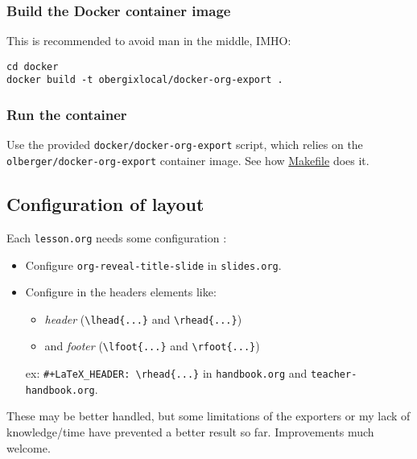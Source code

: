 \documentclass[a4paper]{article}
\begin{document}
\subsubsection{Build the Docker container image}
\label{sec:orga3cd101}

This is recommended to avoid man in the middle, IMHO:

\begin{verbatim}
cd docker
docker build -t obergixlocal/docker-org-export .
\end{verbatim}

\subsubsection{Run the container}
\label{sec:orgce9f130}

Use the provided \texttt{docker/docker-org-export} script, which relies on
the \texttt{olberger/docker-org-export} container image. See how \url{Makefile} does it.

\subsection{Configuration of layout}
\label{sec:org552a672}

Each \texttt{lesson.org} needs some configuration :
\begin{itemize}
\item Configure \texttt{org-reveal-title-slide} in \texttt{slides.org}.

\item Configure in the headers elements like:
\begin{itemize}
\item \emph{header} (\texttt{\textbackslash{}lhead\{...\}} and \texttt{\textbackslash{}rhead\{...\}})
\item and \emph{footer} (\texttt{\textbackslash{}lfoot\{...\}} and \texttt{\textbackslash{}rfoot\{...\}})
\end{itemize}

ex: \texttt{\#+LaTeX\_HEADER: \textbackslash{}rhead\{...\}} in \texttt{handbook.org} and
  \texttt{teacher-handbook.org}.
\end{itemize}

\begin{NOTES}
These may be better handled, but some limitations of the exporters or
my lack of knowledge/time have prevented a better result so
far. Improvements much welcome.
\end{NOTES}
\end{document}
